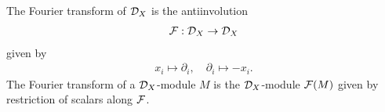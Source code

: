 \documentclass[12pt]{article}
\begin{document}
\begin{definition}
    The Fourier transform of ${\mathcal{D}}_X$ is the antiinvolution \begin{align*}
        {\mathcal{F}}: {\mathcal{D}}_X \to {\mathcal{D}}_X
    \end{align*} given by \begin{align*}
        x_i \mapsto \partial_i, \quad \partial_i \mapsto -x_i.
    \end{align*}
    The Fourier transform of a ${\mathcal{D}}_X$-module $M$ is the ${\mathcal{D}}_X$-module ${\mathcal{F}}(M)$ 
    given by restriction of scalars along ${\mathcal{F}}$.
\end{definition}
\end{document}
